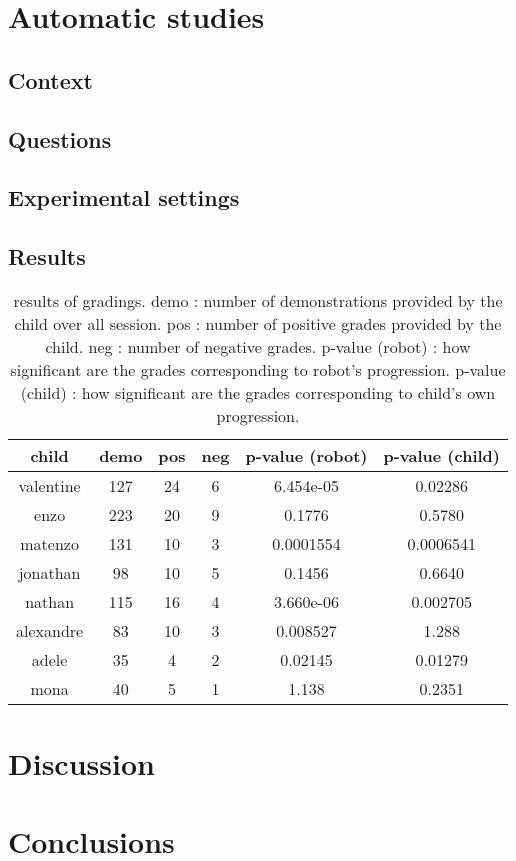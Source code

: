 \documentclass{sig-alternate}
\begin{document}
\section{Automatic studies}
\subsection{Context}
\subsection{Questions}
\subsection{Experimental settings}
\subsection{Results}
\begin{table}
    \centering
    \begin{tabular}{|c|c|c|c|c|c|}
        \hline
        child & demo & pos & neg & p-value (robot) & p-value (child)\\ \hline
        valentine & 127 & 24 & 6 & 6.454e-05 & 0.02286\\ \hline
        enzo & 223 & 20 & 9 & 0.1776 & 0.5780\\ \hline
        matenzo & 131 & 10 & 3 & 0.0001554 & 0.0006541\\ \hline
        jonathan & 98 & 10 & 5 &  0.1456 & 0.6640\\ \hline
        nathan & 115 & 16 & 4 & 3.660e-06 & 0.002705\\ \hline
        alexandre & 83 & 10 & 3 & 0.008527 & 1.288\\ \hline
        adele & 35 & 4 & 2 & 0.02145 & 0.01279\\ \hline
        mona & 40 & 5 & 1 &  1.138 & 0.2351\\ \hline
    \end{tabular}
    \caption{results of gradings. demo : number of demonstrations provided by
        the child over all session. pos : number of positive grades provided by
        the child. neg : number of negative grades. p-value (robot) : how
        significant are the grades corresponding to robot's progression. p-value
    (child) : how significant are the grades corresponding to child's own progression.}
\end{table}


\section{Discussion}

\section{Conclusions}


 
\end{document}
